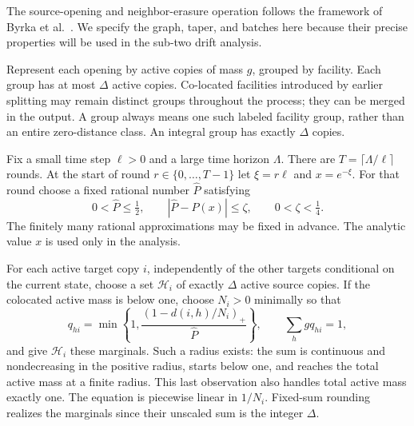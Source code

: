 The source-opening and neighbor-erasure operation follows the framework
of Byrka et al.~\cite[Definitions~3.2 and~5.1]{ByrkaEtAl2026}.
We specify the graph, taper, and batches here because their precise
properties will be used in the sub-two drift analysis.

Represent each opening by active copies of mass $g$, grouped by facility.
Each group has at most $\Delta$ active copies.  Co-located facilities
introduced by earlier splitting may remain distinct groups throughout
the process; they can be merged in the output. A group always means one
such labeled facility group, rather than an entire zero-distance class.
An integral group has exactly $\Delta$ copies.

Fix a small time step $\ell>0$ and a large time horizon $\Lambda$.
There are $T=\lceil\Lambda/\ell\rceil$ rounds.  At the start of round
$r\in\{0,\ldots,T-1\}$ let $\xi=r\ell$ and $x=e^{-\xi}$.
For that round choose a fixed rational number $\widehat P$ satisfying
\begin{equation}\label{eq:rnd-taper-approximation}
 0<\widehat P\le\tfrac12,
 \qquad |\widehat P-P(x)|\le\zeta,
 \qquad 0<\zeta<\tfrac14.
\end{equation}
The finitely many rational approximations may be fixed in advance.
The analytic value $x$ is used only in the analysis.

For each active target copy $i$, independently of the other targets
conditional on the current state, choose a set $\mathcal H_i$ of exactly
$\Delta$ active source copies.  If the colocated active mass is below one,
choose $N_i>0$ minimally so that
\begin{equation}\label{eq:rnd-edge-marginals}
 q_{hi}=\min\left\{1,\frac{(1-d(i,h)/N_i)_+}{\widehat P}\right\},
 \qquad \sum_h gq_{hi}=1,
\end{equation}
and give $\mathcal H_i$ these marginals.  Such a radius exists: the sum
is continuous and nondecreasing in the positive radius, starts below
one, and reaches the total active mass at a finite radius.  This last
observation also handles total active mass exactly one.  The equation
is piecewise linear in $1/N_i$.  Fixed-sum rounding realizes the
marginals since their unscaled sum is the integer $\Delta$.

